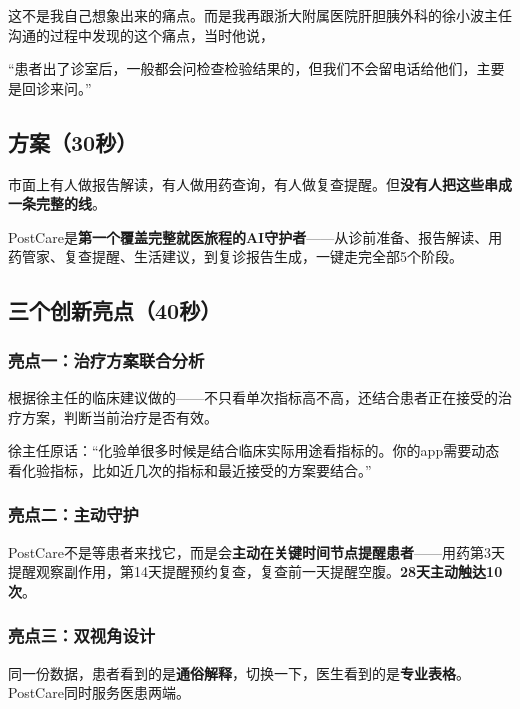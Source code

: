 \documentclass[UTF8, a4paper, 11pt]{ctexart}
\begin{document}
这不是我自己想象出来的痛点。而是我再跟浙大附属医院肝胆胰外科的徐小波主任沟通的过程中发现的这个痛点，当时他说，

\begin{warnbox}[徐主任原话]
``患者出了诊室后，一般都会问检查检验结果的，但我们不会留电话给他们，主要是回诊来问。''
\end{warnbox}

\subsection{方案（30秒）}

市面上有人做报告解读，有人做用药查询，有人做复查提醒。但\textbf{没有人把这些串成一条完整的线}。

PostCare是\textbf{第一个覆盖完整就医旅程的AI守护者}——从诊前准备、报告解读、用药管家、复查提醒、生活建议，到复诊报告生成，一键走完全部5个阶段。

\subsection{三个创新亮点（40秒）}

\subsubsection{亮点一：治疗方案联合分析}

根据徐主任的临床建议做的——不只看单次指标高不高，还结合患者正在接受的治疗方案，判断当前治疗是否有效。

{\color{gray}\small 徐主任原话：``化验单很多时候是结合临床实际用途看指标的。你的app需要动态看化验指标，比如近几次的指标和最近接受的方案要结合。''}

\subsubsection{亮点二：主动守护}

PostCare不是等患者来找它，而是会\textbf{主动在关键时间节点提醒患者}——用药第3天提醒观察副作用，第14天提醒预约复查，复查前一天提醒空腹。\textbf{28天主动触达10次}。

\subsubsection{亮点三：双视角设计}

同一份数据，患者看到的是\textbf{通俗解释}，切换一下，医生看到的是\textbf{专业表格}。PostCare同时服务医患两端。

\end{document}

